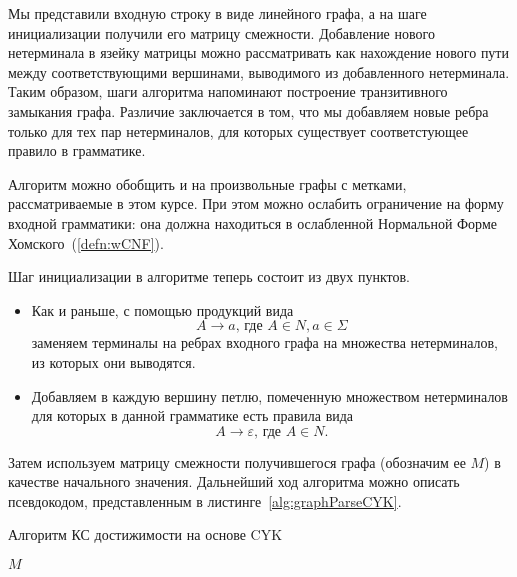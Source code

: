 Мы представили входную строку в виде линейного графа, а на шаге инициализации получили его матрицу смежности. Добавление нового нетерминала в язейку матрицы можно рассматривать как нахождение нового пути между соответствующими вершинами, выводимого из добавленного нетерминала. Таким образом, шаги алгоритма напоминают построение транзитивного замыкания графа. Различие заключается в том, что мы добавляем новые ребра только для тех пар нетерминалов, для которых существует соответстующее правило в грамматике.

Алгоритм можно обобщить и на произвольные графы с метками, рассматриваемые в этом курсе. При этом можно ослабить ограничение на форму входной грамматики: она должна находиться в ослабленной Нормальной Форме Хомского~(\ref{defn:wCNF}).

Шаг инициализации в алгоритме теперь состоит из двух пунктов.
\begin{itemize}
\item Как и раньше, с помощью продукций вида \[A \to a \text{, где } A \in N, a \in \Sigma\]
заменяем терминалы на ребрах входного графа на множества нетерминалов, из которых они выводятся.
\item  Добавляем в каждую вершину петлю, помеченную множеством нетерминалов для которых в данной грамматике есть правила вида $$A \to \varepsilon\text{, где } A \in N.$$
\end{itemize}

 Затем используем матрицу смежности получившегося графа (обозначим ее $M$) в качестве начального значения. Дальнейший ход алгоритма можно описать псевдокодом, представленным в листинге~\ref{alg:graphParseCYK}.

\begin{algorithm}[H]
    \begin{algorithmic}[1]
        \caption{Алгоритм КС достижимости на основе CYK}
        \label{alg:graphParseCYK}

                        \EndIf
                    \EndFor
                \EndFor
            \EndFor
        \EndFor
        \EndWhile
        \State \Return $M$
        \EndFunction
    \end{algorithmic}
\end{algorithm}

